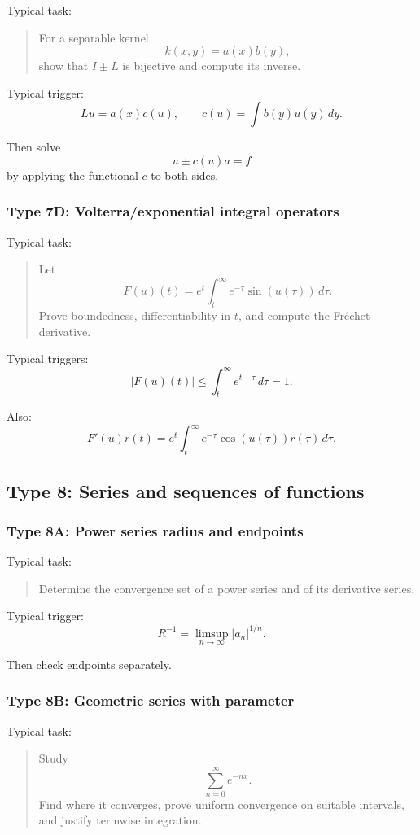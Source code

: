 Typical task:
\begin{quote}
    For a separable kernel
    \[
        k(x,y)=a(x)b(y),
    \]
    show that $I\pm L$ is bijective and compute its inverse.
\end{quote}

Typical trigger:
\[
    Lu=a(x)c(u),
    \qquad
    c(u)=\int b(y)u(y)\,dy.
\]

Then solve
\[
    u\pm c(u)a=f
\]
by applying the functional $c$ to both sides.

\subsubsection*{Type 7D: Volterra/exponential integral operators}

Typical task:
\begin{quote}
    Let
    \[
        F(u)(t)=e^t\int_t^\infty e^{-\tau}\sin(u(\tau))\,d\tau.
    \]
    Prove boundedness, differentiability in $t$, and compute the Fréchet derivative.
\end{quote}

Typical triggers:
\[
    |F(u)(t)|
    \leq
    \int_t^\infty e^{t-\tau}\,d\tau
    =
    1.
\]

Also:
\[
    F'(u)r(t)
    =
    e^t\int_t^\infty e^{-\tau}\cos(u(\tau))r(\tau)\,d\tau.
\]

\subsection{Type 8: Series and sequences of functions}

\subsubsection*{Type 8A: Power series radius and endpoints}

Typical task:
\begin{quote}
    Determine the convergence set of a power series and of its derivative series.
\end{quote}

Typical trigger:
\[
    R^{-1}=\limsup_{n\to\infty}|a_n|^{1/n}.
\]

Then check endpoints separately.

\subsubsection*{Type 8B: Geometric series with parameter}

Typical task:
\begin{quote}
    Study
    \[
        \sum_{n=0}^\infty e^{-nx}.
    \]
    Find where it converges, prove uniform convergence on suitable intervals, and justify termwise integration.
\end{quote}

